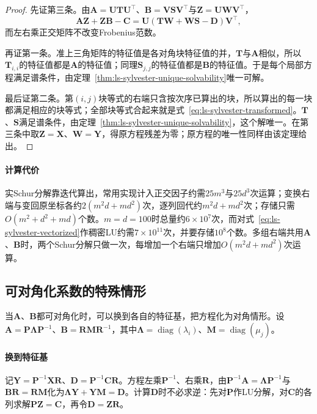 \begin{proof}
先证第三条。由$\bm A=\bm U\bm T\bm U^\top$、$\bm B=\bm V\bm S\bm V^\top$与$\bm Z=\bm U\bm W\bm V^\top$，
\[
 \bm A\bm Z+\bm Z\bm B-\bm C=\bm U(\bm T\bm W+\bm W\bm S-\bm D)\bm V^\top,
\]
而左右乘正交矩阵不改变Frobenius范数。

再证第一条。准上三角矩阵的特征值是各对角块特征值的并，$\bm T$与$\bm A$相似，所以$\bm T_{i,i}$的特征值都是$\bm A$的特征值；同理$\bm S_{j,j}$的特征值都是$\bm B$的特征值。于是每个局部方程满足谱条件，由定理~\ref{thm:ls-sylvester-unique-solvability}唯一可解。

最后证第二条。第$(i,j)$块等式的右端只含按次序已算出的块，所以算出的每一块都满足相应的块等式；全部块等式合起来就是式~\eqref{eq:ls-sylvester-transformed}。$\bm T$、$\bm S$满足谱条件，由定理~\ref{thm:ls-sylvester-unique-solvability}，这个解唯一。在第三条中取$\bm Z=\bm X$、$\bm W=\bm Y$，得原方程残差为零；原方程的唯一性同样由该定理给出。
\end{proof}

\paragraph{计算代价}
实Schur分解靠迭代算出，常用实现计入正交因子约需$25m^3$与$25d^3$次运算；变换右端与变回原坐标各约$2(m^2d+md^2)$次，逐列回代约$m^2d+md^2$次；存储只需$O(m^2+d^2+md)$个数。$m=d=100$时总量约$6\times10^7$次，而对式~\eqref{eq:ls-sylvester-vectorized}作稠密LU约需$7\times10^{11}$次，并要存储$10^8$个数。多组右端共用$\bm A$、$\bm B$时，两个Schur分解只做一次，每增加一个右端只增加$O(m^2d+md^2)$次运算。

\subsection{可对角化系数的特殊情形}
\label{sec:ls-sylvester-diagonalizable}

当$\bm A$、$\bm B$都可对角化时，可以换到各自的特征基，把方程化为对角情形。设$\bm A=\bm P\bm\Lambda\bm P^{-1}$、$\bm B=\bm R\bm M\bm R^{-1}$，其中$\bm\Lambda=\operatorname{diag}(\lambda_i)$、$\bm M=\operatorname{diag}(\mu_j)$。

\paragraph{换到特征基}
记$\bm Y=\bm P^{-1}\bm X\bm R$、$\bm D=\bm P^{-1}\bm C\bm R$。方程左乘$\bm P^{-1}$、右乘$\bm R$，由$\bm P^{-1}\bm A=\bm\Lambda\bm P^{-1}$与$\bm B\bm R=\bm R\bm M$化为$\bm\Lambda\bm Y+\bm Y\bm M=\bm D$。计算$\bm D$时不必求逆：先对$\bm P$作LU分解，对$\bm C$的各列求解$\bm P\bm Z=\bm C$，再令$\bm D=\bm Z\bm R$。

